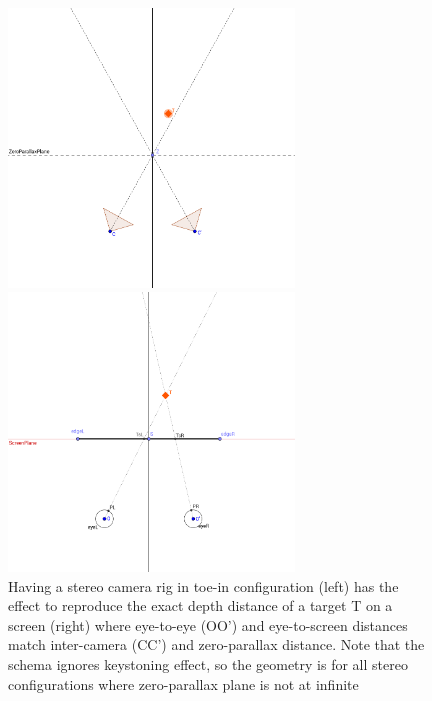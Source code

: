 \begin{figure} 
\centering   
\begin{minipage}[t]{0.49\textwidth}
\includegraphics[width=\linewidth, height=7.4cm]{schemas/stereocam_only}
\end{minipage}
\begin{minipage}[t]{0.49\textwidth}
\includegraphics[width=\linewidth, height=7.4cm]{schemas/eyes_only}
\end{minipage}
\caption{Having a stereo camera rig in toe-in configuration (left) has the effect to reproduce the exact depth distance of a target T on a screen (right) where eye-to-eye (OO') and eye-to-screen distances match inter-camera (CC') and zero-parallax distance. Note that the schema ignores keystoning effect, so the geometry is for all stereo configurations where zero-parallax plane is not at infinite}
\label{fig:stereo_eye_camera_comparison}
\end{figure}

